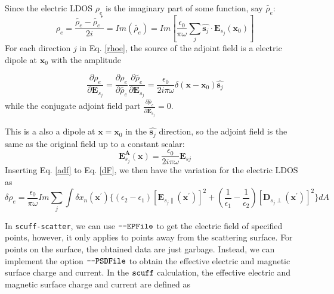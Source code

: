 \documentclass[12pt]{article}
\begin{document}
Since the electric LDOS $\rho_e$ is the imaginary part of some function, say $\tilde{\rho_e}$:
\begin{equation}
\rho_e = \frac{\tilde{\rho_e}-\tilde{\rho_e}^*}{2i}=Im(\tilde{\rho_e}) = Im[\frac{\epsilon_0}{\pi\omega}\sum_j\hat{\mathbf{s}_j}\cdot \mathbf{E}_{s_j}(\mathbf{x}_0)]
\end{equation}
For each direction $j$ in Eq. \eqref{rhoe}, the source of the adjoint field is a electric dipole at $\mathbf{x}_0$ with the amplitude 

\begin{equation}
\frac{\partial \rho_e}{\partial \mathbf{E}_{s_j}}=\frac{\partial \rho_e}{\partial \tilde{\rho_e}}\frac{\partial \tilde{\rho_e}}{\partial \mathbf{E}_{s_j}} = \frac{\epsilon_0}{2i\pi\omega}\delta(\mathbf{x}-\mathbf{x}_0)\hat{\mathbf{s}_j}
\end{equation}
while the conjugate adjoint field part $\frac{\partial \tilde{\rho_e}}{\partial \mathbf{\bar{E}}_{s_j}} =0$.

This is a also a dipole at $\mathbf{x}=\mathbf{x}_0$ in the $\hat{\mathbf{s}_j}$ direction, so the adjoint field is the same as the original field up to a constant scalar:
\begin{equation}
\mathbf{E}^\mathbf{A}_{s_j}(\mathbf{x}) = \frac{\epsilon_0}{2i\pi\omega}\mathbf{E}_{sj}\label{adf}
\end{equation}
Inserting Eq. \eqref{adf} to Eq. \eqref{dF}, we then have the variation for the electric LDOS as
\begin{equation}
\delta \rho_e =  \frac{\epsilon_0}{\pi\omega}Im\sum_j\int \delta x_n(\mathbf{x}^\prime) \{(\epsilon_2 -\epsilon_1) [\mathbf{E}_{s_j\parallel}(\mathbf{x}^\prime)]^2+ (\frac{1}{\epsilon_1}-\frac{1}{\epsilon_2})[\mathbf{D}_{s_j\perp}(\mathbf{x}^\prime)]^2\}dA\label{fderiv}
\end{equation}

In \verb|scuff-scatter|, we can use $\verb|--EPFile|$ to get the electric field of specified points, however, it only applies to points away from the scattering surface. For points on the surface, the obtained data are just garbage. Instead, we can implement the option $\verb|--PSDFile|$ to obtain the effective electric and magnetic surface charge and current. In the $\verb|scuff|$ calculation, the effective electric and magnetic surface charge and current are defined as
\end{document}
